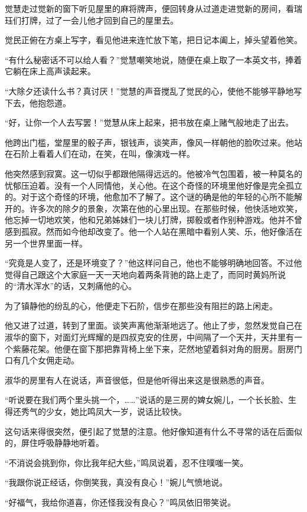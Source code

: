 \par 觉慧走过觉新的窗下听见屋里的麻将牌声，便回转身从过道走进觉新的房间，看瑞珏们打牌，过了一会儿他才回到自己的屋里去。
\par 觉民正俯在方桌上写字，看见他进来连忙放下笔，把日记本阖上，掉头望着他笑。
\par “有什么秘密话不可以给人看？”觉慧嘲笑地说，随便在桌上取了一本英文书，捧着它躺在床上高声读起来。
\par “大除夕还读什么书？真讨厌！”觉慧的声音搅乱了觉民的心，使他不能够平静地写下去，他抱怨道。
\par “好，让你一个人去写罢！”觉慧从床上起来，把书放在桌上赌气般地走了出去。
\par 他跨出门槛，堂屋里的骰子声，银钱声，谈笑声，像风一样朝他的脸吹过来。他站在石阶上看着人们在动，在笑，在叫，像演戏一样。
\par 他突然感到寂寞。这一切似乎都跟他隔得远远的。他被冷气包围着，被一种莫名的忧郁压迫着。没有一个人同情他，关心他。在这个奇怪的环境里他好像是完全孤立的。对于这个奇怪的环境，他愈加不了解了。这个谜的确是他的年轻的心所不能解开的。许多次的除夕的景象，次第在他的心里出现。在那些时候，他快活地欢笑，他忘掉一切地欢笑，他和兄弟姊妹们一块儿打牌，掷骰或者作别种游戏。他并不曾感到孤寂。然而如今他却改变了。他一个人站在黑暗中看别人笑、乐，他好像活在另一个世界里面一样。
\par “究竟是人变了，还是环境变了？”他这样问自己，他也不能够明确地回答。不过他觉得自己跟这个大家庭一天一天地向着两条背驰的路上走了，而同时黄妈所说的“清水浑水”的话，又刺痛他的心。
\par 为了镇静他的纷乱的心，他便走下石阶，信步在那些没有阻拦的路上闲走。
\par 他又进了过道，转到了里面。谈笑声离他渐渐地远了。他止了步，忽然发觉自己在淑华的窗下，对面灯光辉耀的是四叔克安的住房，中间隔了一个天井，天井里有一个紫藤花架。他便在窗下那把靠背椅上坐下来，茫然地望着斜对角的厨房。厨房门口有几个女佣走动。
\par 淑华的房里有人在说话，声音很低，但是他听得出来这是很熟悉的声音。
\par “听说要在我们两个里头挑一个，……”说话的是三房的婢女婉儿，一个长长脸、生得还秀气的少女，她比鸣凤大一岁，说话比较快。
\par 这句话来得很突然，便引起了觉慧的注意。他好像知道有什么不寻常的话在后面似的，屏住呼吸静静地听着。
\par “不消说会挑到你，你比我年纪大些，”鸣凤说着，忍不住噗嗤一笑。
\par “我跟你说正经话，你倒笑我，真没有良心！”婉儿气愤地说。
\par “好福气，我给你道喜，你还怪我没有良心？”鸣凤依旧带笑说。
